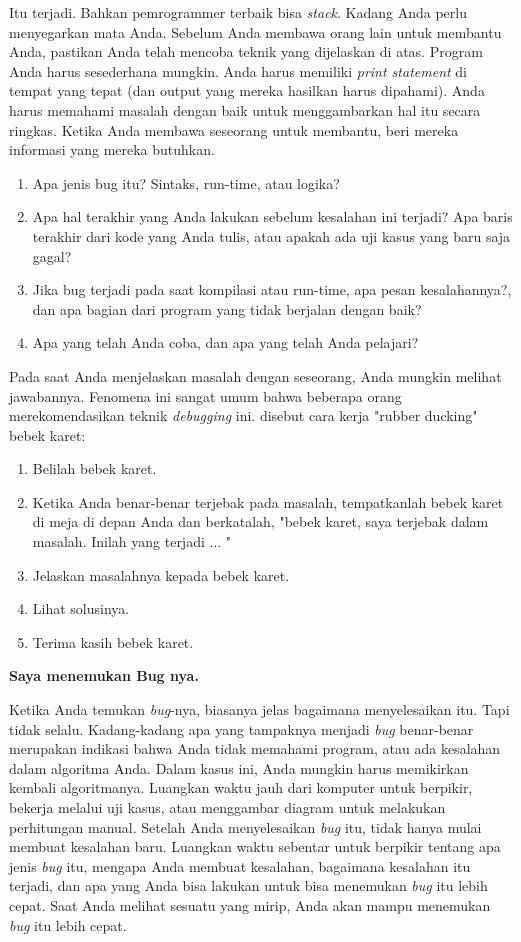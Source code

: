 \noindent Itu terjadi. Bahkan pemrogrammer terbaik bisa \textit{stack}. Kadang Anda perlu menyegarkan mata Anda. Sebelum Anda membawa orang lain untuk membantu Anda, pastikan Anda telah mencoba teknik yang dijelaskan di atas. Program Anda harus sesederhana mungkin. Anda harus memiliki \textit{print statement} di tempat yang tepat (dan output yang mereka hasilkan harus dipahami). Anda harus memahami masalah dengan baik untuk menggambarkan hal itu secara ringkas.
Ketika Anda membawa seseorang untuk membantu, beri mereka informasi yang mereka butuhkan.
\begin{enumerate}
    \item Apa jenis bug itu? Sintaks, run-time, atau logika?
    \item Apa hal terakhir yang Anda lakukan sebelum kesalahan ini terjadi? Apa baris terakhir dari kode yang Anda tulis, atau apakah ada uji kasus yang baru saja gagal?
    \item Jika bug terjadi pada saat kompilasi atau run-time, apa pesan kesalahannya?, dan apa bagian dari program yang tidak berjalan dengan baik?
    \item Apa yang telah Anda coba, dan apa yang telah Anda pelajari?
\end{enumerate}

\noindent Pada saat Anda menjelaskan masalah dengan seseorang, Anda mungkin melihat jawabannya. Fenomena ini sangat umum bahwa beberapa orang merekomendasikan teknik \textit{debugging} ini. disebut cara kerja "rubber ducking" bebek karet:
\begin{enumerate}
    \item Belilah bebek karet.
    \item Ketika Anda benar-benar terjebak pada masalah, tempatkanlah bebek karet di meja di depan Anda dan berkatalah, "bebek karet, saya terjebak dalam masalah. Inilah yang terjadi ... "
    \item Jelaskan masalahnya kepada bebek karet.
    \item Lihat solusinya.
    \item Terima kasih bebek karet.
\end{enumerate}

\noindent \textbf{Saya menemukan Bug nya.}

\noindent Ketika Anda temukan \textit{bug}-nya, biasanya jelas bagaimana menyelesaikan itu. Tapi tidak selalu. Kadang-kadang apa yang tampaknya menjadi \textit{bug} benar-benar merupakan indikasi bahwa Anda tidak memahami program, atau ada kesalahan dalam algoritma Anda. Dalam kasus ini, Anda mungkin harus memikirkan kembali algoritmanya. Luangkan waktu jauh dari komputer untuk berpikir, bekerja melalui uji kasus, atau menggambar diagram untuk melakukan perhitungan manual.
Setelah Anda menyelesaikan \textit{bug} itu, tidak hanya mulai membuat kesalahan baru. Luangkan waktu sebentar untuk berpikir tentang apa jenis \textit{bug} itu, mengapa Anda membuat kesalahan, bagaimana kesalahan itu terjadi, dan apa yang Anda bisa lakukan untuk bisa menemukan \textit{bug} itu lebih cepat. Saat Anda melihat sesuatu yang mirip, Anda akan mampu menemukan \textit{bug} itu lebih cepat.

%
